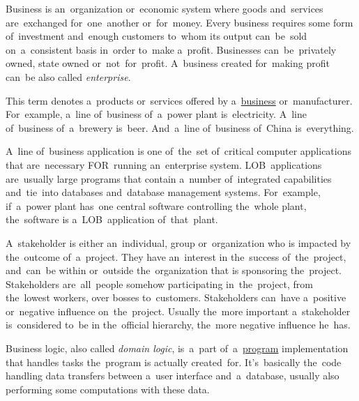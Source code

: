 \label{business}
Business is an~organization or~economic system where goods and~services are~exchanged for~one~another or~for~money. Every business requires some form of~investment and~enough customers to~whom its output can~be~sold on~a~consistent basis in~order to~make a~profit. Businesses can~be~privately owned, state owned or~not~for~profit. A~business created for~making profit can~be also called \textit{enterprise}.

This term denotes a~products or~services offered by a~\hyperref[business]{business} or~manufacturer. For~example, a~line of~business of~a~power plant is~electricity. A~line of~business of~a~brewery is~beer. And~a~line of~business of~China is~everything.

A~line of~business application is one of~the~set of~critical computer applications that are~necessary FOR~running an~enterprise system. LOB~applications are~usually large programs that contain a~number of~integrated capabilities and~tie~into databases and~database management systems. For~example, if~a~power plant has~one central software controlling the~whole plant, the~software is a~LOB~application of~that~plant.

A~stakeholder is either an~individual, group or~organization who is impacted by the~outcome of~a~project. They have an~interest in the~success of~the~project, and~can~be within or~outside the~organization that is sponsoring the~project. Stakeholders are~all~people somehow participating in~the~project, from the~lowest workers, over bosses to~customers. Stakeholders can~have a~positive or~negative influence on~the~project. Usually the~more important a~stakeholder is~considered to~be in the~official hierarchy, the~more negative influence he~has.
\newpage

\label{businesslogic}
Business logic, also called \textit{domain logic}, is~a~part of~a~\hyperref[applicationprocessprogramservicethread]{program} implementation that handles tasks the~program is actually created~for. It's~basically the~code handling data transfers between a~user interface and~a~database, usually also performing some computations with these data.


